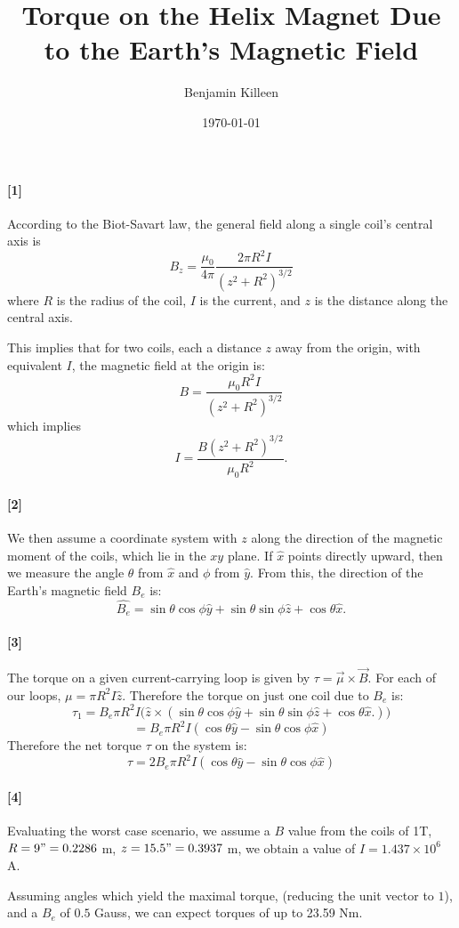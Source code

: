 \documentclass[11pt]{article}
\title{Torque on the Helix Magnet Due to the Earth's Magnetic Field}
\author{Benjamin Killeen}
\date{\today}
\begin{document}
\maketitle

\paragraph{[1]}

According to the Biot-Savart law, the general field along a single coil's central axis is
$$B_z = \frac{\mu_0}{4\pi}\frac{2\pi R^2I}{(z^2 + R^2)^{3/2}}$$
where $R$ is the radius of the coil, $I$ is the current, and $z$ is the distance along the central axis.

This implies that for two coils, each a distance $z$ away from the origin, with equivalent $I$, the magnetic field at the origin is:
    $$
    B = \frac{\mu_0 R^2 I}{(z^2 + R^2)^{3/2}}
    $$
which implies
    $$
    I = \frac{B(z^2 + R^2)^{3/2}}{\mu_0 R^2}.
    $$

\paragraph{[2]}
We then assume a coordinate system with $z$ along the direction of the magnetic moment of the coils, which lie in the $xy$ plane. If $\hat{x}$ points directly upward, then we measure the angle $\theta$ from $\hat{x}$ and $\phi$ from $\hat{y}$. From this, the direction of the Earth's magnetic field $B_e$ is:
    $$
    \hat{B_e} = \sin\theta \cos\phi \hat{y} +
                      \sin\theta \sin\phi \hat{z} +
                      \cos\theta \hat{x}.
    $$
\paragraph{[3]}
The torque on a given current-carrying loop is given by $\tau = \vec{\mu} \times \vec{B}$. For each of our loops, $\mu = \pi R^2 I \hat{z}$. Therefore the torque on just one coil due to $B_e$ is:
    $$
    \tau_1 = B_e \pi R^2 I \big(\hat{z} \times ( \sin\theta \cos\phi \hat{y} +
                                                                      \sin\theta \sin\phi \hat{z} +
                                                                      \cos\theta \hat{x}.)
                                      \big)
    $$
    $$
     = B_e \pi R^2 I (\cos\theta \hat{y} - \sin\theta\cos\phi \hat{x})
    $$
Therefore the net torque $\tau$ on the system is:
    $$
    \tau = 2 B_e \pi R^2 I (\cos\theta \hat{y} - \sin\theta\cos\phi \hat{x})
    $$
\paragraph{[4]}
Evaluating the worst case scenario, we assume a $B$ value from the coils of 1T, $R = 9" = 0.2286$ m, $z = 15.5" = 0.3937$ m, we obtain a value of $I = 1.437 \times 10^6 $ A.

Assuming angles which yield the maximal torque, (reducing the unit vector to $1$), and a $B_e$ of $0.5$ Gauss, we can expect torques of up to 23.59 Nm.
\end{document}
